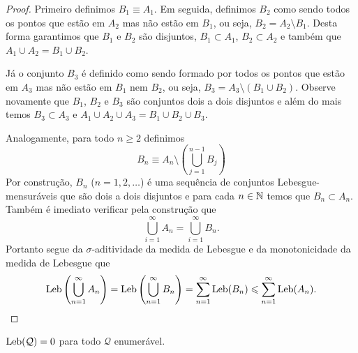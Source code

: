 \begin{proof}
            Primeiro definimos $B_1\equiv A_1$.
            Em seguida, definimos $B_2$ como sendo todos os pontos que estão em $A_2$
            mas não estão em $B_1$, ou seja, $B_2=A_2\setminus B_1$. 
            Desta forma garantimos que $B_1$ e $B_2$ são disjuntos, 
            $B_1\subset A_1$, $B_2\subset A_2$ e também que $A_1\cup A_2 = B_1\cup B_2$.
        
            Já o conjunto $B_3$ é definido como sendo formado por todos os 
            pontos que estão em $A_3$ mas não estão em $B_1$ nem $B_2$, 
            ou seja, $B_3= A_3\setminus(B_1\cup B_2)$. Observe novamente que 
            $B_1$, $B_2$ e $B_3$ são conjuntos dois a dois disjuntos e além do mais temos
            $B_3\subset A_3$ e $A_1\cup A_2\cup A_3 = B_1\cup B_2\cup B_3$.
            
            Analogamente, para todo $n\geqslant 2$ definimos 
            \[
                B_n \equiv A_n\setminus \left( \bigcup_{j=1}^{n-1} B_j \right)
            \]
            Por construção, $B_n$ ($n=1,2,\ldots$) é uma sequência de conjuntos 
            Lebesgue-mensuráveis que são dois a dois disjuntos e para cada 
            $n\in\mathbb{N}$ temos que $B_n\subset A_n$. Também é imediato verificar
            pela construção que 
            \[
                \bigcup_{i=1}^{\infty} A_n = \bigcup_{i=1}^{\infty} B_n.
            \]
            Portanto
            segue da $\sigma$-aditividade da medida de Lebesgue 
            e da monotonicidade da medida de Lebesgue que
            \begin{align*}
                \mathrm{Leb}\left( \bigcup_{n=1}^{\infty} A_n\right) 
                =
                \mathrm{Leb}\left( \bigcup_{n=1}^{\infty} B_n\right)
                =
                \sum_{n=1}^{\infty}\mathrm{Leb}(B_n)
                \leqslant 
                \sum_{n=1}^{\infty}\mathrm{Leb}(A_n).
            \end{align*}
        \end{proof}
        \begin{proposicao}
        \label{enumeravel-medida-nula}
            $\mathrm{Leb}(\mathcal{Q}) = 0$ para todo $\mathcal{Q}$ enumerável.
        \end{proposicao}
